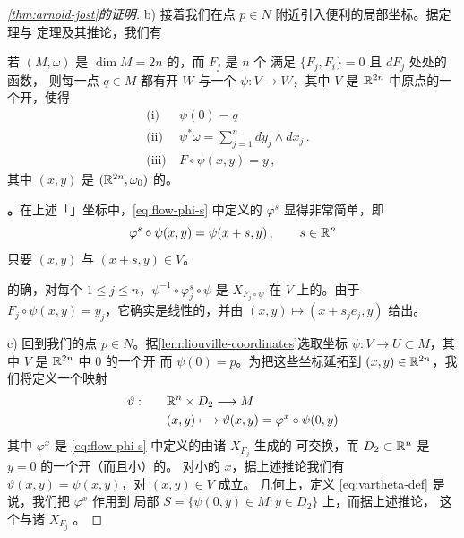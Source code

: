 \begin{proof}[\cref*{thm:arnold-jost}的证明]
b) 接着我们在点 $p\in N$ 附近引入便利的局部坐标。据\trDarboux{}定理与%
\trLiouville{}定理及其推论，我们有
\begin{lemma}[\trLiouville]\label{lem:liouville-coordinates}
若 $(M,\omega)$ 是 $\dim M=2n$ 的\trSymplecticManifold，而 $F_{j}$ 是 $n$ 个%
满足 $\{F_{j},F_{i}\}=0$ 且 $dF_{j}$ 处处\trLinearlyIndependent{}的函数，%
则每一点 $q\in M$ 都有开\trNeighborhood{} $W$ 与一个\trDiffeomorphism{}%
$\psi:V\to W$，其中 $V$ 是 $\mathbb{R}^{2n}$ 中原点的一个开\trNeighborhood，使得
\[
\begin{array}{lll}
\text{(i)}   &\ \psi(0)=q &\\
\text{(ii)}  &\ \psi^{*}\omega=\displaystyle\sum_{j=1}^{n}dy_{j}\wedge dx_{j}\,. &\\
\text{(iii)} &\ F\circ\psi(x,y)=y\,, &
\end{array}
\]
其中 $(x,y)$ 是 $(\mathbb{R}^{2n},\omega_{0})$ 的\trSymplecticCoordinates。
\end{lemma}

\textbf{\trhCorollary。}\quad 在上述「\trLiouville」坐标中，\eqref{eq:flow-phi-s}%
中定义的\trFlow{} $\varphi^{s}$ 显得非常简单，即
\begin{equation}\label{eq:liouville-flow}
\varphi^{s}\circ\psi(x,y)=\psi(x+s,y)\,,\qquad s\in\mathbb{R}^{n}
\end{equation}
只要 $(x,y)$ 与 $(x+s,y)\in V$。

的确，对每个 $1\leq j\leq n$，$\psi^{-1}\circ\varphi^{s}_{j}\circ\psi$ 是%
\trHamiltonianVectorField{} $X_{F_{j}\circ\psi}$ 在 $V$ 上的\trFlow。由于%
$F_{j}\circ\psi(x,y)=y_{j}$，它确实是线性的，并由%
$(x,y)\mapsto(x+s_{j}e_{j},y)$ 给出。

c) 回到我们的点 $p\in N$。据\cref{lem:liouville-coordinates}选取\trLiouville{}坐标%
$\psi:V\to U\subset M$，其中 $V$ 是 $\mathbb{R}^{2n}$ 中 $0$ 的一个开\trNeighborhood{}%
而 $\psi(0)=p$。为把这些坐标延拓到 $(x,y)\in\mathbb{R}^{2n}$，我们将定义一个映射
\begin{equation}\label{eq:vartheta-def}
\begin{aligned}
\vartheta:\qquad &\mathbb{R}^{n}\times D_{2}\longrightarrow M\\
&(x,y)\longmapsto\vartheta(x,y)=\varphi^{x}\circ\psi(0,y)
\end{aligned}
\end{equation}
其中 $\varphi^{x}$ 是 \eqref{eq:flow-phi-s} 中定义的由诸\trVectorField{} $X_{F_{j}}$ 生成的%
可交换\trFlow，而 $D_{2}\subset\mathbb{R}^{n}$ 是 $y=0$ 的一个开（而且小）的\trNeighborhood。%
对小的 $x$，据上述推论我们有 $\vartheta(x,y)=\psi(x,y)$，对 $(x,y)\in V$ 成立。%
几何上，定义 \eqref{eq:vartheta-def} 是说，我们把\trFlow{} $\varphi^{x}$ 作用到%
局部\trSection{} $S=\{\psi(0,y)\in M:y\in D_{2}\}$ 上，而据上述推论，%
这个\trSection{}与诸\trVectorField{} $X_{F_{j}}$ \trTransversal。


\end{proof}
